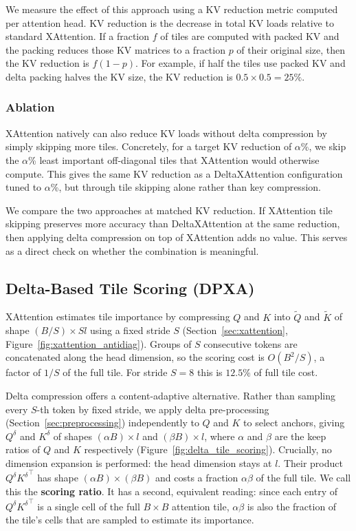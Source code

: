 We measure the effect of this approach using a KV reduction metric computed per attention head. KV reduction is the decrease in total KV loads relative to standard XAttention. If a fraction $f$ of tiles are computed with packed KV and the packing reduces those KV matrices to a fraction $p$ of their original size, then the KV reduction is $f(1-p)$. For example, if half the tiles use packed KV and delta packing halves the KV size, the KV reduction is $0.5 \times 0.5 = 25\%$.

\subsubsection{Ablation}
\label{sec:xattention_ablation}

XAttention natively can also reduce KV loads without delta compression by simply skipping more tiles. Concretely, for a target KV reduction of $\alpha$\%, we skip the $\alpha$\% least important off-diagonal tiles that XAttention would otherwise compute. This gives the same KV reduction as a DeltaXAttention configuration tuned to $\alpha$\%, but through tile skipping alone rather than key compression.

We compare the two approaches at matched KV reduction. If XAttention tile skipping preserves more accuracy than DeltaXAttention at the same reduction, then applying delta compression on top of XAttention adds no value. This serves as a direct check on whether the combination is meaningful.

\subsection{Delta-Based Tile Scoring (DPXA)}
\label{sec:delta_tile_scoring}

XAttention estimates tile importance by compressing $Q$ and $K$ into $\tilde{Q}$ and $\tilde{K}$ of shape $(B/S) \times Sl$ using a fixed stride $S$ (Section~\ref{sec:xattention}, Figure~\ref{fig:xattention_antidiag}). Groups of $S$ consecutive tokens are concatenated along the head dimension, so the scoring cost is $O(B^2/S)$, a factor of $1/S$ of the full tile. For stride $S=8$ this is $12.5\%$ of full tile cost.

Delta compression offers a content-adaptive alternative. Rather than sampling every $S$-th token by fixed stride, we apply delta pre-processing (Section~\ref{sec:preprocessing}) independently to $Q$ and $K$ to select anchors, giving $Q^\delta$ and $K^\delta$ of shapes $(\alpha B) \times l$ and $(\beta B) \times l$, where $\alpha$ and $\beta$ are the keep ratios of $Q$ and $K$ respectively (Figure~\ref{fig:delta_tile_scoring}). Crucially, no dimension expansion is performed: the head dimension stays at $l$. Their product $Q^\delta {K^\delta}^\top$ has shape $(\alpha B) \times (\beta B)$ and costs a fraction $\alpha \beta$ of the full tile. We call this the \textbf{scoring ratio}. It has a second, equivalent reading: since each entry of $Q^\delta {K^\delta}^\top$ is a single cell of the full $B \times B$ attention tile, $\alpha\beta$ is also the fraction of the tile's cells that are sampled to estimate its importance.


